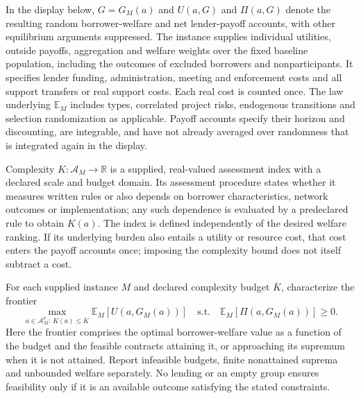 \documentclass[11pt,a4paper]{article}
\begin{document}
In the display below, \(G=G_M(a)\) and \(U(a,G)\) and \(\Pi(a,G)\) denote the resulting random borrower-welfare and net lender-payoff accounts, with other equilibrium arguments suppressed. The instance supplies individual utilities, outside payoffs, aggregation and welfare weights over the fixed baseline population, including the outcomes of excluded borrowers and nonparticipants. It specifies lender funding, administration, meeting and enforcement costs and all support transfers or real support costs. Each real cost is counted once. The law underlying \(\mathbb E_M\) includes types, correlated project risks, endogenous transitions and selection randomization as applicable. Payoff accounts specify their horizon and discounting, are integrable, and have not already averaged over randomness that is integrated again in the display.

Complexity \(K:\mathcal A_M\to\mathbb R\) is a supplied, real-valued assessment index with a declared scale and budget domain. Its assessment procedure states whether it measures written rules or also depends on borrower characteristics, network outcomes or implementation; any such dependence is evaluated by a predeclared rule to obtain \(K(a)\). The index is defined independently of the desired welfare ranking. If its underlying burden also entails a utility or resource cost, that cost enters the payoff accounts once; imposing the complexity bound does not itself subtract a cost.

For each supplied instance \(M\) and declared complexity budget \(\overline K\), characterize the frontier
\[
 \max_{a\in\mathcal A_M^{\mathrm v}:\,K(a)\leq\overline K}\mathbb E_M[U(a,G_M(a))]
 \quad\text{s.t.}\quad\mathbb E_M[\Pi(a,G_M(a))]\geq0.
\]
Here the frontier comprises the optimal borrower-welfare value as a function of the budget and the feasible contracts attaining it, or approaching its supremum when it is not attained. Report infeasible budgets, finite nonattained suprema and unbounded welfare separately. No lending or an empty group ensures feasibility only if it is an available outcome satisfying the stated constraints.
\end{document}
